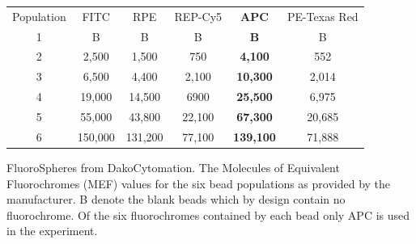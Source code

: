 \begin{table}[!h]\footnotesize
\begin{center}
\begin{tabular} {|c c c c c c|}
\cline{1-6}
Population  & FITC    & RPE     & REP-Cy5 & \textbf{APC}     & PE-Texas Red\\
\cline{1-6}
1           & B       & B       & B       & \textbf{B}       & B \\
2           & 2,500   & 1,500   & 750     & \textbf{4,100}   & 552\\
3           & 6,500   & 4,400   & 2,100   & \textbf{10,300}  & 2,014\\
4           & 19,000  & 14,500  & 6900    & \textbf{25,500}  & 6,975\\
5           & 55,000  & 43,800  & 22,100  & \textbf{67,300}  & 20,685\\
6           & 150,000 & 131,200 & 77,100  & \textbf{139,100} & 71,888\\
\cline{1-6}
\end{tabular}
\end{center}
{FluoroSpheres from DakoCytomation.}
{
The Molecules of Equivalent Fluorochromes (MEF) values for the six bead populations as provided by the manufacturer.
B denote the blank beads which by design contain no fluorochrome.
Of the six fluorochromes contained by each bead only APC is used in the experiment.
}
\end{table}

